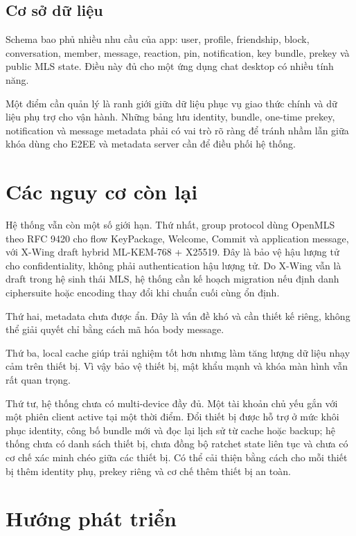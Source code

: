 \subsection{Cơ sở dữ liệu}

Schema bao phủ nhiều nhu cầu của app: user, profile, friendship, block, conversation, member, message, reaction, pin, notification, key bundle, prekey và public MLS state. Điều này đủ cho một ứng dụng chat desktop có nhiều tính năng.

Một điểm cần quản lý là ranh giới giữa dữ liệu phục vụ giao thức chính và dữ liệu phụ trợ cho vận hành. Những bảng lưu identity, bundle, one-time prekey, notification và message metadata phải có vai trò rõ ràng để tránh nhầm lẫn giữa khóa dùng cho E2EE và metadata server cần để điều phối hệ thống.


\section{Các nguy cơ còn lại}

Hệ thống vẫn còn một số giới hạn. Thứ nhất, group protocol dùng OpenMLS theo RFC 9420 cho flow KeyPackage, Welcome, Commit và application message, với X-Wing draft hybrid ML-KEM-768 + X25519. Đây là bảo vệ hậu lượng tử cho confidentiality, không phải authentication hậu lượng tử. Do X-Wing vẫn là draft trong hệ sinh thái MLS, hệ thống cần kế hoạch migration nếu định danh ciphersuite hoặc encoding thay đổi khi chuẩn cuối cùng ổn định.

Thứ hai, metadata chưa được ẩn. Đây là vấn đề khó và cần thiết kế riêng, không thể giải quyết chỉ bằng cách mã hóa body message.

Thứ ba, local cache giúp trải nghiệm tốt hơn nhưng làm tăng lượng dữ liệu nhạy cảm trên thiết bị. Vì vậy bảo vệ thiết bị, mật khẩu mạnh và khóa màn hình vẫn rất quan trọng.

Thứ tư, hệ thống chưa có multi-device đầy đủ. Một tài khoản chủ yếu gắn với một phiên client active tại một thời điểm. Đổi thiết bị được hỗ trợ ở mức khôi phục identity, công bố bundle mới và đọc lại lịch sử từ cache hoặc backup; hệ thống chưa có danh sách thiết bị, chưa đồng bộ ratchet state liên tục và chưa có cơ chế xác minh chéo giữa các thiết bị. Có thể cải thiện bằng cách cho mỗi thiết bị thêm identity phụ, prekey riêng và cơ chế thêm thiết bị an toàn.

\section{Hướng phát triển}


